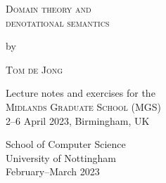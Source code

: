 \begin{titlepage}
\begin{center}

  \large %

  {\Huge\textsc{Domain theory and \\ denotational semantics}\par}


  by


  {\huge\textsc{Tom de Jong}}


  {\Large{Lecture notes and exercises for the\\
      \textsc{Midlands Graduate School (MGS)}}} \\
  2--6 April 2023, Birmingham, UK


  \begingroup
  \endgroup

  \vfill

  \flushright
  {\normalsize{School of Computer Science \\
  University of Nottingham \\
  February--March 2023}}

\end{center}
\end{titlepage}